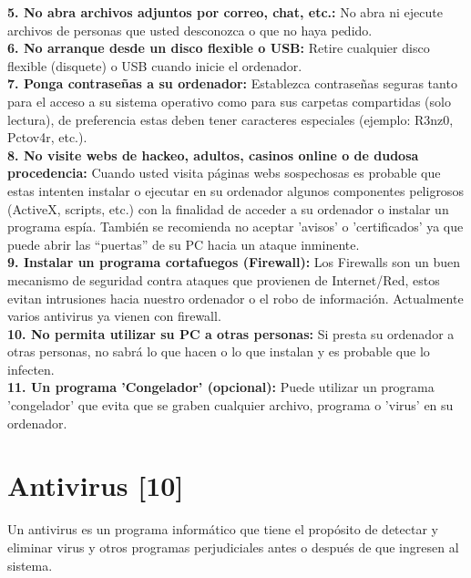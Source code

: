 \documentclass[12pt,a4paper]{article}
\begin{document}
	\textbf{5. No abra archivos adjuntos por correo, chat, etc.:} No abra ni ejecute archivos de personas que usted desconozca o que no haya pedido.\\
	
	\textbf{6. No arranque desde un disco flexible o USB:} Retire cualquier disco flexible (disquete) o USB cuando inicie el ordenador.\\
	
	\textbf{7. Ponga contraseñas a su ordenador:} Establezca contraseñas seguras tanto para el acceso a su sistema operativo como para sus carpetas compartidas (solo lectura), de preferencia estas deben tener caracteres especiales (ejemplo: R3nz0, Pctov4r, etc.).\\
	
	\textbf{8. No visite webs de hackeo, adultos, casinos online o de dudosa procedencia:} Cuando usted visita páginas webs sospechosas es probable que estas intenten instalar o ejecutar en su ordenador algunos componentes peligrosos (ActiveX, scripts, etc.) con la finalidad de acceder a su ordenador o instalar un programa espía. También se recomienda no aceptar 'avisos' o 'certificados' ya que puede abrir las “puertas” de su PC hacia un ataque inminente.\\

	\textbf{9. Instalar un programa cortafuegos (Firewall):} Los Firewalls son un buen mecanismo de seguridad contra ataques que provienen de Internet/Red, estos evitan intrusiones hacia nuestro ordenador o el robo de información. Actualmente varios antivirus ya vienen con firewall.\\

	\textbf{10. No permita utilizar su PC a otras personas:} Si presta su ordenador a otras personas, no sabrá lo que hacen o lo que instalan y es probable que lo infecten.\\

	\textbf{11. Un programa 'Congelador' (opcional):} Puede utilizar un programa 'congelador' que evita que se graben cualquier archivo, programa o 'virus' en su ordenador.
	
	\section{Antivirus [10]}
	
	Un antivirus es un programa informático que tiene el propósito de detectar y eliminar virus y otros programas perjudiciales antes o después de que ingresen al sistema.
	
\end{document}
